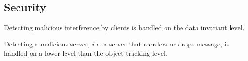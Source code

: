 \subsection{Security}
Detecting malicious interference by clients is handled on the data invariant level.

Detecting a malicious server, \textit{i.e.} a server that reorders or drops message, is handled on a lower level than the object tracking level. 